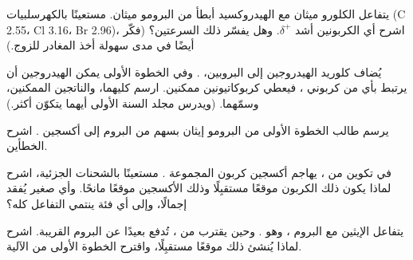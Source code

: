 \begin{exercise}[$\star\star$]\label{exo:g12:curly-arrows:11}
يتفاعل الكلورو ميثان مع  الهيدروكسيد أبطأ من
البرومو ميثان. مستعينًا بالكهرسلبيات (C 2.55، Cl 3.16، Br 2.96)،
اشرح أي الكربونين أشد $\delta^+$. وهل يفسّر ذلك
السرعتين؟ (فكّر أيضًا في مدى سهولة أخذ  المغادر للزوج.)
\end{exercise}

\begin{exercise}[$\star\star\star$]\label{exo:g12:curly-arrows:12}
يُضاف كلوريد الهيدروجين إلى البروبين، . وفي الخطوة الأولى
يمكن  الهيدروجين أن يرتبط بأي من كربوني ، فيعطي
كربوكاتيونين ممكنين. ارسم كليهما، والناتجين الممكنين،
وسمّهما. (ويدرس مجلد السنة الأولى أيهما يتكوّن أكثر.)
\end{exercise}

\begin{exercise}[$\star\star\star$]\label{exo:g12:curly-arrows:13}
يرسم طالب الخطوة الأولى من  البرومو إيثان بسهم
من  البروم إلى أكسجين . اشرح
الخطأين.
\end{exercise}

\begin{exercise}[$\star\star\star$]\label{exo:g12:curly-arrows:14}
في تكوين  من  ، يهاجم
أكسجين  كربون المجموعة . مستعينًا
بالشحنات الجزئية، اشرح لماذا يكون ذلك الكربون موقعًا مستقبِلًا وذلك
الأكسجين موقعًا مانحًا. وأي  صغير يُفقد إجمالًا، وإلى أي
فئة ينتمي التفاعل كله؟
\end{exercise}

\begin{exercise}[$\star\star\star$]\label{exo:g12:curly-arrows:15}
يتفاعل الإيثين مع البروم ، وهو . وحين يقترب  
من ، تُدفع  
بعيدًا عن  البروم القريبة. اشرح لماذا يُنشئ ذلك
موقعًا مستقبِلًا، واقترح الخطوة الأولى من الآلية.
\end{exercise}

